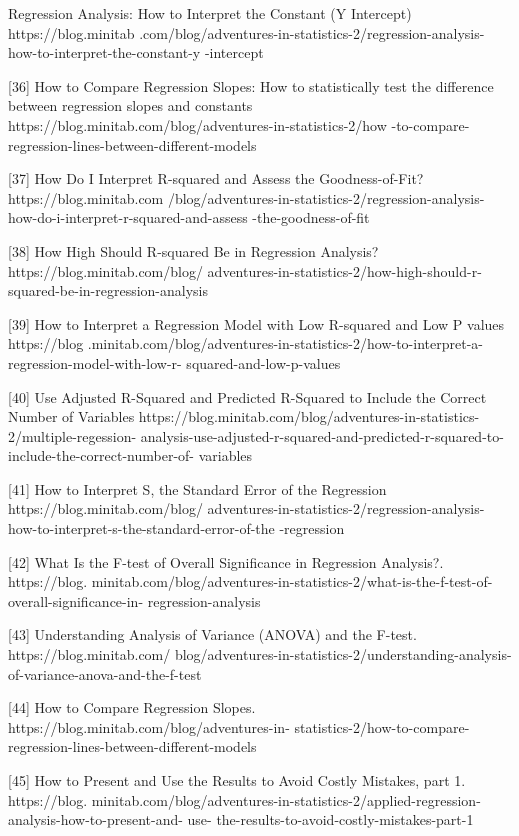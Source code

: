 \begin{flushleft}
[35]	Regression Analysis: How to Interpret the Constant (Y Intercept) https://blog.minitab
.com/blog/adventures-in-statistics-2/regression-analysis-how-to-interpret-the-constant-y
-intercept

[36]	How to Compare Regression Slopes: How to statistically test the difference between 
regression slopes and constants https://blog.minitab.com/blog/adventures-in-statistics-2/how
-to-compare-regression-lines-between-different-models

[37]	How Do I Interpret R-squared and Assess the Goodness-of-Fit? https://blog.minitab.com
/blog/adventures-in-statistics-2/regression-analysis-how-do-i-interpret-r-squared-and-assess
-the-goodness-of-fit

[38]	How High Should R-squared Be in Regression Analysis? https://blog.minitab.com/blog/
adventures-in-statistics-2/how-high-should-r-squared-be-in-regression-analysis

[39]	How to Interpret a Regression Model with Low R-squared and Low P values https://blog
.minitab.com/blog/adventures-in-statistics-2/how-to-interpret-a-regression-model-with-low-r-
squared-and-low-p-values

[40]	Use Adjusted R-Squared and Predicted R-Squared to Include the Correct Number of 
Variables https://blog.minitab.com/blog/adventures-in-statistics-2/multiple-regession-
analysis-use-adjusted-r-squared-and-predicted-r-squared-to-include-the-correct-number-of-
variables

[41]	How to Interpret S, the Standard Error of the Regression https://blog.minitab.com/blog/
adventures-in-statistics-2/regression-analysis-how-to-interpret-s-the-standard-error-of-the 
-regression

[42]	What Is the F-test of Overall Significance in Regression Analysis?. https://blog.
minitab.com/blog/adventures-in-statistics-2/what-is-the-f-test-of-overall-significance-in-
regression-analysis

[43]	Understanding Analysis of Variance (ANOVA) and the F-test. https://blog.minitab.com/
blog/adventures-in-statistics-2/understanding-analysis-of-variance-anova-and-the-f-test

[44]	How to Compare Regression Slopes. https://blog.minitab.com/blog/adventures-in-
statistics-2/how-to-compare-regression-lines-between-different-models

[45]	How to Present and Use the Results to Avoid Costly Mistakes, part 1. https://blog.
minitab.com/blog/adventures-in-statistics-2/applied-regression-analysis-how-to-present-and-
use- the-results-to-avoid-costly-mistakes-part-1


\end{flushleft}
